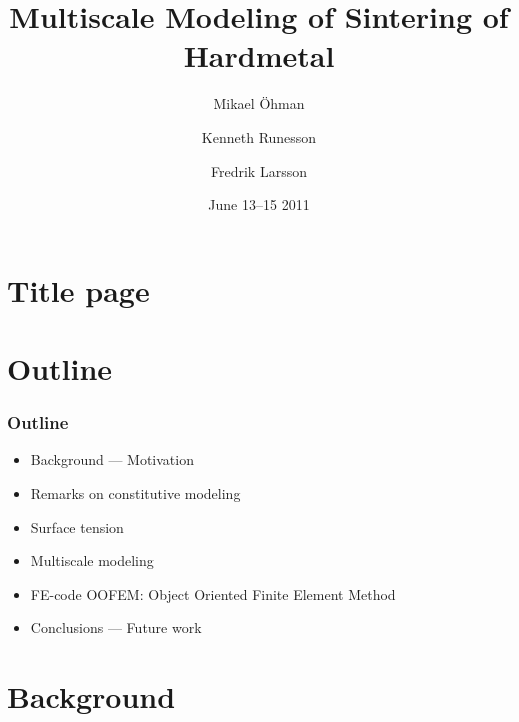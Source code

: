 \documentclass[11pt]{beamer} %
\title{Multiscale Modeling of Sintering of Hardmetal}
\author[Mikael Öhman et al.]{Mikael Öhman\and Kenneth Runesson\and Fredrik Larsson}
\institute{Dept. of Applied Mechanics\\ Chalmers University of Technology}
\date{June 13--15 2011}
\newcommand{\roughcite}[1]{\textsc{#1}}
\begin{document}
\section{Title page}
\begin{frame}[plain]
 \titlepage
\end{frame}

\section{Outline}
\begin{frame}
 \frametitle{Outline}

\begin{itemize}
 \item Background --- Motivation
 \item Remarks on constitutive modeling
 \item Surface tension
 \item Multiscale modeling
 \item FE-code OOFEM: Object Oriented Finite Element Method
 \item Conclusions --- Future work
\end{itemize}
\end{frame}

\section{Background}
% 
% 
\end{document}
